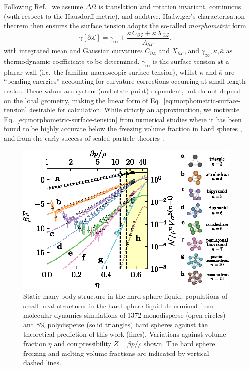 \documentclass[11pt,twoside]{report}
\begin{document}
Following Ref.\ \cite{KonigPRL2004} we assume $\Delta\Omega$ is translation and rotation invariant, continuous (with respect to the Hausdorff metric), and additive.
Hadwiger's characterisation theorem \cite{Hadwiger1957} then ensures the surface tension adopts the so-called \emph{morphometric} form
\begin{equation}\label{eq:morphometric-surface-tension}
  \gamma[\partial\mathcal{L}] =
  \gamma_\infty +
  \frac{\kappa \, C_{\partial\mathcal{L}} + \overline{\kappa} \, X_{\partial\mathcal{L}}}
       {A_{\partial\mathcal{L}}},
\end{equation}
with integrated mean and Gaussian curvatures $C_{\partial\mathcal{L}}$ and $X_{\partial\mathcal{L}}$, and $\gamma_\infty,\kappa,\overline{\kappa}$ as thermodynamic coefficients to be determined.
$\gamma_\infty$ is the surface tension at a planar wall (i.e.\ the familiar macroscopic surface tension), whilst $\kappa$ and $\overline{\kappa}$ are ``bending energies'' accounting for curvature corrections occurring at small length scales.
These values are system (and state point) dependent, but do not depend on the local geometry, making the linear form of Eq.\ \eqref{eq:morphometric-surface-tension} desirable for calculation.
While strictly an approximation, we motivate Eq.\ \eqref{eq:morphometric-surface-tension} from numerical studies where it has been found to be highly accurate below the freezing volume fraction in hard spheres \cite{RothPRL2006,LairdPRE2012,BlokhuisPRE2013,UrrutiaPRE2014,Hansen-GoosJCP2014}, and from the early success of scaled particle theories \cite{ReissJCP1959,ReissJCP1960}.

\begin{figure}
  \includegraphics[width=\linewidth,center]{structure-populations}
  \caption[Concentration of local structures in the equilibrium liquid]{
    Static many-body structure in the hard sphere liquid: populations of small local structures in the hard sphere liquid determined from molecular dynamics simulations of 1372 monodisperse (open circles) and 8\% polydisperse (solid triangles) hard spheres against the theoretical prediction of this work (lines).
    Variations against volume fraction $\eta$ and compressibility $Z = \beta p/\rho$ shown.
    The hard sphere freezing and melting volume fractions are indicated by vertical dashed lines.
  }
  \label{fig:structure-populations}
\end{figure}
\end{document}
